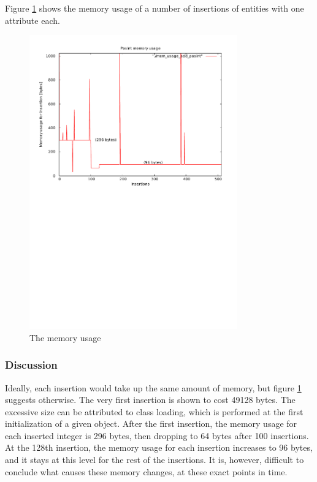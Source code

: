Figure \ref{fig:memUsageInsertionPosInt} shows the memory usage of
a number of insertions of entities with one attribute each.

\begin{figure}[h!]
\centering
\includegraphics[width = 0.8\textwidth, trim = 0 15cm 0 0] {img/memoryConsumption_posint.pdf}
\caption{The memory usage}
\label{fig:memUsageInsertionPosInt}
\end{figure}


\subsubsection{Discussion}

Ideally, each insertion would take up the same amount of memory, but
figure \ref{fig:memUsageInsertionPosInt} suggests otherwise. The
very first insertion is shown to cost 49128 bytes. The excessive size
can be attributed to class loading, which is performed at the first
initialization of a given object. After the first insertion, the memory
usage for each inserted integer is 296 bytes, then dropping to 64
bytes after 100 insertions. At the 128th insertion, the memory usage
for each insertion increases to 96 bytes, and it stays at this level
for the rest of the insertions. It is, however, difficult to conclude
what causes these memory changes, at these exact points in time.

